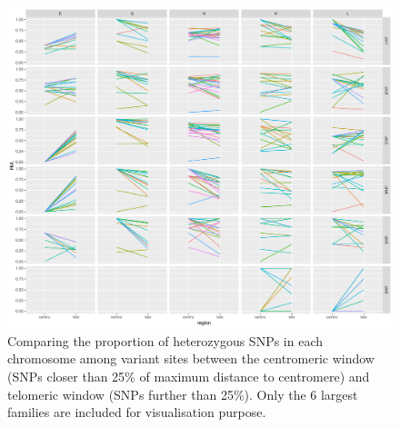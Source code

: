 \documentclass[10pt,a4paper]{report}
\begin{document}
\begin{figure}[h]
	\begin{center}
		\includegraphics[width=1\textwidth]{Num_CSD_loci/line_centro25_telo_chr_fam.pdf}
		\caption{Comparing the proportion of heterozygous SNPs in each chromosome among variant sites between the centromeric window (SNPs closer than 25\% of maximum distance to centromere) and telomeric window (SNPs further than 25\%). Only the 6 largest families are included for visualisation purpose.}
		\label{cen_tel_chr}
	\end{center}
\end{figure}
\end{document}
